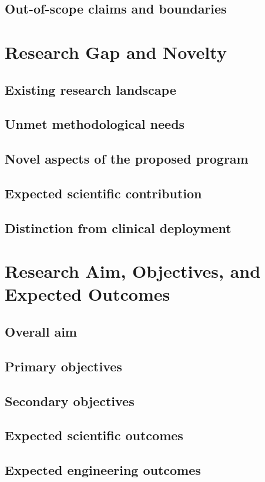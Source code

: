 \documentclass[11pt,journal,onecolumn,draftclsnofoot]{IEEEtran}
\begin{document}
\subsection{Out-of-scope claims and boundaries}

\section{Research Gap and Novelty}
\subsection{Existing research landscape}
\subsection{Unmet methodological needs}
\subsection{Novel aspects of the proposed program}
\subsection{Expected scientific contribution}
\subsection{Distinction from clinical deployment}

\section{Research Aim, Objectives, and Expected Outcomes}
\subsection{Overall aim}
\subsection{Primary objectives}
\subsection{Secondary objectives}
\subsection{Expected scientific outcomes}
\subsection{Expected engineering outcomes}
\end{document}
